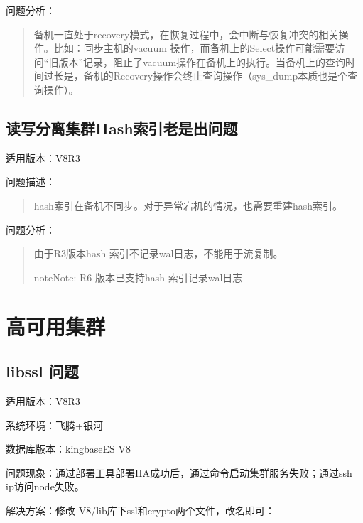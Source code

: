 \documentclass[letterpaper,10pt,english]{sphinxmanual}
\begin{document}
问题分析：
\begin{quote}

备机一直处于recovery模式，在恢复过程中，会中断与恢复冲突的相关操作。比如：同步主机的vacuum 操作，而备机上的Select操作可能需要访问“旧版本”记录，阻止了vacuum操作在备机上的执行。当备机上的查询时间过长是，备机的Recovery操作会终止查询操作（sys\_dump本质也是个查询操作）。
\end{quote}


\section{读写分离集群Hash索引老是出问题}
\label{\detokenize{high-availability:hash}}
适用版本：V8R3

问题描述：
\begin{quote}

hash索引在备机不同步。对于异常宕机的情况，也需要重建hash索引。
\end{quote}

问题分析：
\begin{quote}

由于R3版本hash 索引不记录wal日志，不能用于流复制。

\begin{sphinxadmonition}{note}{Note:}
R6 版本已支持hash 索引记录wal日志
\end{sphinxadmonition}
\end{quote}


\chapter{高可用集群}
\label{\detokenize{cluster_faq:id1}}\label{\detokenize{cluster_faq::doc}}

\section{libssl 问题}
\label{\detokenize{cluster_faq:libssl}}
适用版本：V8R3

系统环境：飞腾+银河

数据库版本：kingbaseES V8

问题现象：通过部署工具部署HA成功后，通过命令启动集群服务失败；通过ssh ip访问node失败。

解决方案：修改 V8/lib库下ssl和crypto两个文件，改名即可：

\begin{sphinxVerbatim}[commandchars=\\\{\}]
\end{sphinxVerbatim}
\end{document}
